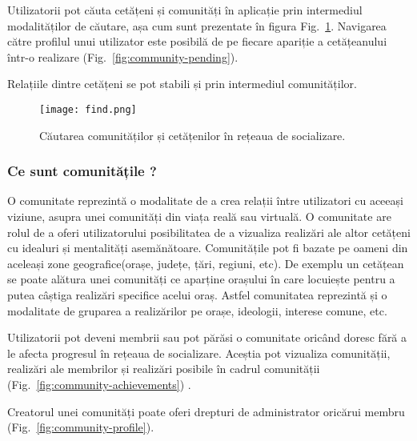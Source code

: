     Utilizatorii pot căuta cetățeni și comunități în aplicație prin intermediul modalităților de căutare, 
    așa cum sunt prezentate în figura Fig.~\ref{fig:find}. Navigarea către profilul unui utilizator este posibilă
    de pe fiecare apariție a cetățeanului într-o realizare (Fig.~\ref{fig:community-pending}).

    Relațiile dintre cetățeni se pot stabili și prin intermediul comunităților. 
    \begin{figure}[h]
    \texttt{[image: find.png]}
    \centering
    \caption{Căutarea comunităților și cetățenilor în rețeaua de socializare.}
    \label{fig:find}
    \end{figure}   
\subsubsection{Ce sunt comunitățile ?}

    O comunitate reprezintă o modalitate de a crea relații între utilizatori cu aceeași viziune,
    asupra unei comunități din viața reală sau virtuală. O comunitate are rolul de a oferi 
    utilizatorului posibilitatea de a vizualiza realizări ale altor cetățeni cu idealuri și 
    mentalități asemănătoare. Comunitățile pot fi bazate pe oameni din aceleași 
    zone geografice(orașe, județe, țări, regiuni, etc). De exemplu un cetățean se poate 
    alătura unei comunități ce aparține orașului în care locuiește pentru a putea câștiga 
    realizări specifice acelui oraș. Astfel comunitatea reprezintă și o modalitate de gruparea 
    a realizărilor pe orașe, ideologii, interese comune, etc.

    Utilizatorii pot deveni membrii sau pot părăsi o comunitate oricând doresc fără 
    a le afecta progresul în rețeaua de socializare. Aceștia pot vizualiza comunității, realizări ale 
    membrilor și realizări posibile în cadrul comunității (Fig.~\ref{fig:community-achievements}) .

    Creatorul unei comunități poate oferi drepturi de administrator oricărui membru (Fig.~\ref{fig:community-profile}).
  
